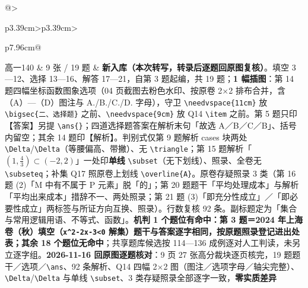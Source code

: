 \documentclass[a4paper,11pt]{article}
\begin{document}
\begin{xltabular}{\textwidth}{@{}>{\raggedright\arraybackslash}p{3.39cm}>{\centering\arraybackslash}p{3.39cm}>{\raggedright\arraybackslash}p{7.96cm}@{}}
高一140 & 9 张 / 19 题 & \textbf{新入库（本次转写，转录后逐题回原图复核）}。填空 3---12、选择 13---16、解答 17---21，自第 3 题起编，共 19 题；\textbf{1 幅插图}：第 14 题四幅坐标函数图象选项（04 页截图去粉色水印、按原卷 2$\times$2 排布合并，含（A）---（D）图注与 A./B./C./D. 字母），守卫 \texttt{\textbackslash{}needvspace\{11cm\}} 放 \texttt{\textbackslash{}bigsec\{二、选择题\}} 之前、\texttt{\textbackslash{}needvspace\{9cm\}} 放 Q14 \texttt{\textbackslash{}item} 之前。第 5 题只印【答案】另提 \texttt{\textbackslash{}ans\{\}}；四道选择题答案在解析末句「故选 A／B／C／B」、括号内留空；其余 14 题印【解析】。判别式仅第 9 题解析 cases 块两处 \texttt{\textbackslash{}Delta}/\texttt{\textbackslash{}Delta\textquotesingle{}}（等腰偏高、带撇）、无 \texttt{\textbackslash{}triangle}；第 15 题解析「\((1,\allowbreak \frac43)\subset\allowbreak (-2,\allowbreak 2)\)」一处印\textbf{单线} \texttt{\textbackslash{}subset}（无下划线）、照录、全卷无 \texttt{\textbackslash{}subseteq}；补集 Q17 照原卷上划线 \texttt{\textbackslash{}overline\{A\}}。原卷存疑照录 3 类（第 16 题 (2)「M 中有不属于 P 元素」脱「的」；第 20 题题干「平均处理成本」与解析「平均出来成本」措辞不一、两处照录；第 21 题 (3)「即充分性成立」／「即必要性成立」两标签与所证方向互换、照录）。行数复核 92 条。副标题定为「集合与常用逻辑用语、不等式、函数」。\textbf{机判 1 个题位有命中：第 3 题＝2024 年上海卷（秋）填空（\texttt{x\^{}2-\allowbreak{}2x-\allowbreak{}3\textless{}0} 解集）题干与答案逐字相同，按原题照录登记进出处表；其余 18 个题位无命中}；共享题库候选按 114---136 成例逐对人工判读，未另立逐字组。\textbf{2026-11-16 回原图逐题核对}：9 页 27 张高分裁块逐页核完，19 题题干／选项／\texttt{\textbackslash{}ans}、92 条解析、Q14 四幅 2$\times$2 图（图注／选项字母／轴尖完整）、\texttt{\textbackslash{}Delta}/\texttt{\textbackslash{}Delta\textquotesingle{}} 与单线 \texttt{\textbackslash{}subset}、3 类存疑照录全部逐字一致，\textbf{零实质差异} \\ \addlinespace[1pt]

\end{xltabular}
\end{document}
